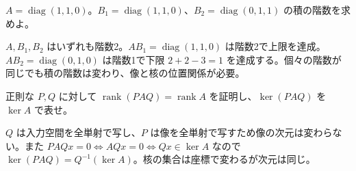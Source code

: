 \documentclass[11pt]{article}
\begin{document}
\newpage
\problem[上限と下限の達成]
$A=\operatorname{diag}(1,1,0)$。$B_1=\operatorname{diag}(1,1,0)$、$B_2=\operatorname{diag}(0,1,1)$ の積の階数を求めよ。
\begin{ans}
$A,B_1,B_2$ はいずれも階数2。$AB_1=\operatorname{diag}(1,1,0)$ は階数2で上限を達成。$AB_2=\operatorname{diag}(0,1,0)$ は階数1で下限 $2+2-3=1$ を達成する。個々の階数が同じでも積の階数は変わり、像と核の位置関係が必要。
\end{ans}
\problem[正則変換]
正則な $P,Q$ に対して $\operatorname{rank}(PAQ)=\operatorname{rank}A$ を証明し、$\ker(PAQ)$ を $\ker A$ で表せ。
\begin{ans}
$Q$ は入力空間を全単射で写し、$P$ は像を全単射で写すため像の次元は変わらない。また $PAQx=0\iff AQx=0\iff Qx\in\ker A$ なので $\ker(PAQ)=Q^{-1}(\ker A)$。核の集合は座標で変わるが次元は同じ。
\end{ans}
\end{document}
